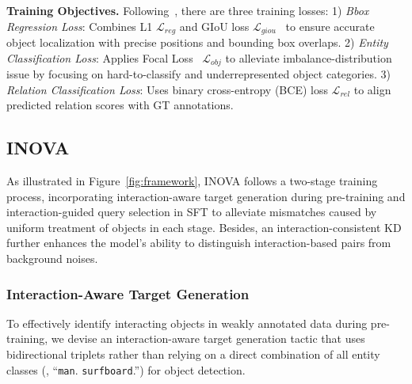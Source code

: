 \textbf{Training Objectives.}
Following~\cite{chen2024expanding}, there are three training losses: 1) \textit{Bbox Regression Loss}: Combines L1 $\mathcal{L}_{reg}$ and GIoU loss $\mathcal{L}_{giou}$~\cite{rezatofighi2019generalized} to ensure accurate object localization with precise positions and bounding box overlaps. 2) \textit{Entity Classification Loss}: Applies Focal Loss~\cite{lin2017focal} $\mathcal{L}_{obj}$ to alleviate imbalance-distribution issue by focusing on hard-to-classify and underrepresented object categories. 3) \textit{Relation Classification Loss}:
Uses binary cross-entropy (BCE) loss $\mathcal{L}_{rel}$ to align predicted relation scores with GT annotations.

\subsection{INOVA}
As illustrated in Figure~\ref{fig:framework}, INOVA follows a two-stage training process, incorporating interaction-aware target generation during pre-training and interaction-guided query selection in SFT to alleviate mismatches caused by uniform treatment of objects in each stage. Besides, an interaction-consistent KD further enhances the model's ability to distinguish interaction-based pairs from background noises.

\subsubsection{Interaction-Aware Target Generation}
\label{sec:itg}

To effectively identify interacting objects in weakly annotated data during pre-training, $\!$we devise an interaction-aware target generation tactic that uses bidirectional triplets rather than relying on a direct combination of all entity classes (\eg, ``\texttt{man}. \texttt{surfboard}.'') for object detection.


